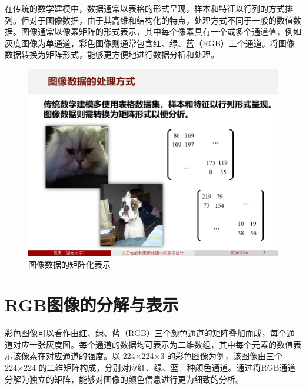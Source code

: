\documentclass[
    report,     %
    oneside,    %
    UTF8,       %
    zihao=-4    %
]{config} %
\begin{document}
在传统的数学建模中，数据通常以表格的形式呈现，样本和特征以行列的方式排列。但对于图像数据，由于其高维和结构化的特点，处理方式不同于一般的数值数据。图像通常以像素矩阵的形式表示，其中每个像素具有一个或多个通道值，例如灰度图像为单通道，彩色图像则通常包含红、绿、蓝（RGB）三个通道。将图像数据转换为矩阵形式，能够更方便地进行数据分析和处理。

\begin{figure}[H] %
    \centering %
    \includegraphics[width=\linewidth]{figures/图像数据的处理方式/1.PNG}
    \caption{图像数据的矩阵化表示}
\end{figure}
\vspace{-0.7em}

\section{RGB图像的分解与表示}

彩色图像可以看作由红、绿、蓝（RGB）三个颜色通道的矩阵叠加而成，每个通道对应一张灰度图。每个通道的数据均可表示为二维数组，其中每个元素的数值表示该像素在对应通道的强度。以 224×224×3 的彩色图像为例，该图像由三个 224×224 的二维矩阵构成，分别对应红、绿、蓝三种颜色通道。通过将RGB通道分解为独立的矩阵，能够对图像的颜色信息进行更为细致的分析。
\end{document}
